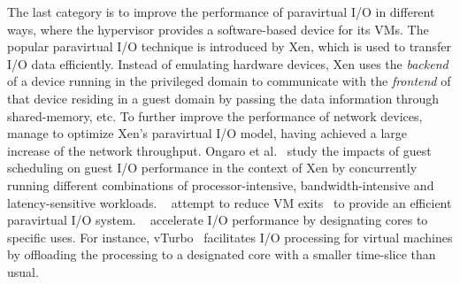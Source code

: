  The last category is to improve the performance of paravirtual I/O in different ways, where the hypervisor provides a software-based device for its VMs.
The popular paravirtual I/O technique is introduced by Xen, which is used to transfer I/O data efficiently. Instead of emulating hardware devices, Xen uses the \emph{backend} of a device running in the privileged domain to communicate with the \emph{frontend} of that device residing in a guest domain by passing the data information through shared-memory, etc. To further improve the performance of network devices, ~\cite{menon2006optimizing,4734994,santos2008bridging} manage to optimize Xen's paravirtual I/O model, having achieved a large increase of the network throughput. Ongaro et al.~\cite{ongaro2008scheduling} study the impacts of guest scheduling on guest I/O performance in the context of Xen by concurrently running different combinations of processor-intensive, bandwidth-intensive and latency-sensitive workloads. ~\cite{gordon2012towards,har2013efficient} attempt to reduce VM exits~\cite{adams2006comparison} to provide an efficient paravirtual I/O system. ~\cite{liao2008software,liu2009virtualization,shalev2010isostack,landau2011splitx,xu2013vturbo} accelerate I/O performance by  designating cores to specific uses. For instance, vTurbo~\cite{xu2013vturbo} facilitates I/O processing for virtual machines by offloading the processing to a designated core with a smaller time-slice than usual.



